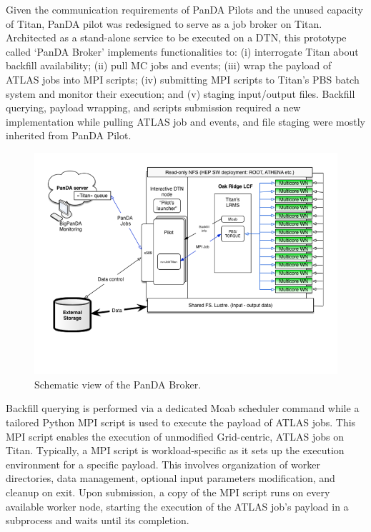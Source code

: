 Given the communication requirements of PanDA Pilots and the unused capacity of
Titan, PanDA pilot was redesigned to serve as a job broker on Titan. Architected
as a stand-alone service to be executed on a DTN, this prototype called `PanDA
Broker' implements functionalities to: (i) interrogate Titan about backfill
availability; (ii) pull MC jobs and events; (iii) wrap the payload of ATLAS jobs
into MPI scripts; (iv) submitting MPI scripts to Titan's PBS batch system and
monitor their execution; and (v) staging input/output files. Backfill querying,
payload wrapping, and scripts submission required a new implementation while
pulling ATLAS job and events, and file staging were mostly inherited from PanDA
Pilot.


\begin{figure}
  \begin{center}
    \includegraphics[width=\columnwidth]{figures/PanDA_setup_at_OLCF.png}
    \caption{Schematic view of the PanDA Broker.}
  \end{center}
\label{fig:panda_broker}
\end{figure}

Backfill querying is performed via a dedicated Moab scheduler command while a
tailored Python MPI script is used to execute the payload of ATLAS jobs. This
MPI script enables the execution of unmodified Grid-centric, ATLAS jobs on
Titan. Typically, a MPI script is workload-specific as it sets up the execution
environment for a specific payload. This involves organization of worker
directories, data management, optional input parameters modification, and
cleanup on exit. Upon submission, a copy of the MPI script runs on every
available worker node,
starting the execution of the ATLAS job's payload in a subprocess and waits
until its completion.

